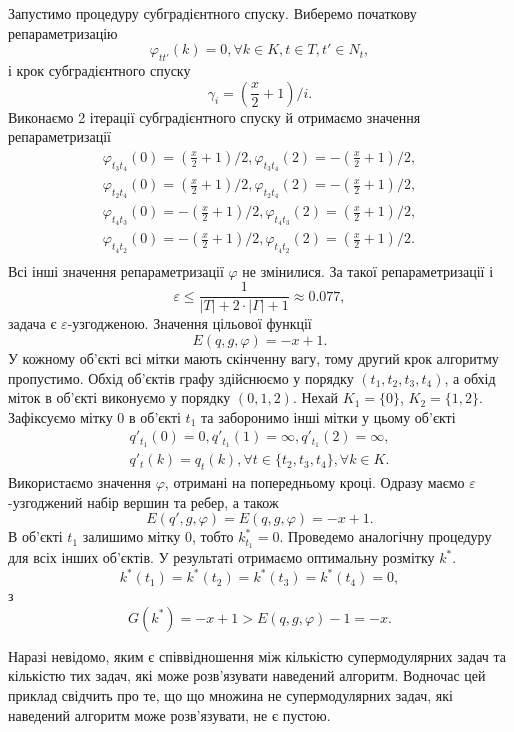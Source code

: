Запустимо процедуру субградієнтного спуску. Виберемо початкову репараметризацію
\begin{equation}
    \varphi_{tt'}(k)=0,\forall k\in K, t\in T, t'\in N_t,
\end{equation}
і крок субградієнтного спуску 
\begin{equation}
    \gamma_i=\left(\frac{x}{2}+1\right)/i.
\end{equation}
Виконаємо 2 ітерації субградієнтного спуску й отримаємо значення репараметризації 
\begin{equation}
    \begin{aligned}
       \varphi_{t_3t_4}(0)=\left(\frac{x}{2}+1\right)/2, \varphi_{t_3t_4}(2)=-\left(\frac{x}{2}+1\right)/2,\\
       \varphi_{t_2t_4}(0)=\left(\frac{x}{2}+1\right)/2, \varphi_{t_2t_4}(2)=-\left(\frac{x}{2}+1\right)/2,\\
       \varphi_{t_4t_3}(0)=-\left(\frac{x}{2}+1\right)/2, \varphi_{t_4t_3}(2)=\left(\frac{x}{2}+1\right)/2,\\
       \varphi_{t_4t_2}(0)=-\left(\frac{x}{2}+1\right)/2, \varphi_{t_4t_2}(2)=\left(\frac{x}{2}+1\right)/2.\\
    \end{aligned}
\end{equation}
Всі інші значення репараметризації $\varphi$ не змінилися. За такої репараметризації і 
\begin{equation}
    \varepsilon\leq \frac{1}{|T|+2\cdot|\Gamma|+1}\approx 0.077,
\end{equation}
задача є $\varepsilon$-узгодженою.
Значення цільової функції 
\begin{equation}
    E(q,g,\varphi)=-x+1.
\end{equation}
У кожному об'єкті всі мітки мають скінченну вагу, тому другий крок алгоритму пропустимо.
Обхід об'єктів графу здійснюємо у порядку $(t_1,t_2,t_3,t_4)$, а обхід міток в 
об'єкті виконуємо у порядку $(0,1,2)$. Нехай $K_1=\{0\}$, $K_2=\{1,2\}$. Зафіксуємо мітку $0$ в 
об'єкті $t_1$ та заборонимо інші мітки у цьому об'єкті
\begin{equation}
    \begin{aligned}
    q'_{t_1}(0)=0,q'_{t_1}(1)=\infty,q'_{t_1}(2)=\infty,\\
    q'_t(k)=q_t(k),\forall t\in \{t_2,t_3,t_4\}, \forall k\in K.
    \end{aligned}
\end{equation}
Використаємо значення $\varphi$, отримані на попередньому кроці. Одразу маємо 
$\varepsilon$-узгоджений набір вершин та ребер, а також 
\begin{equation}
    E(q',g,\varphi)=E(q,g,\varphi)=-x+1.
\end{equation}
В об'єкті $t_1$ залишимо мітку $0$, тобто $k^*_{t_1}=0$. Проведемо аналогічну процедуру 
для всіх інших об'єктів. У результаті отримаємо оптимальну розмітку $k^*$.
\begin{equation}
    k^*(t_1)=k^*(t_2)=k^*(t_3)=k^*(t_4)=0,
\end{equation}
з
\begin{equation}
    G(k^*)=-x+1>E(q,g,\varphi)-1=-x.
\end{equation}

Наразі невідомо, яким є співвідношення між кількістю супермодулярних задач та кількістю тих задач, 
які може розв'язувати наведений алгоритм. Водночас цей приклад свідчить про те, що
що множина не супермодулярних задач, які наведений
алгоритм може розв’язувати, не є пустою.
